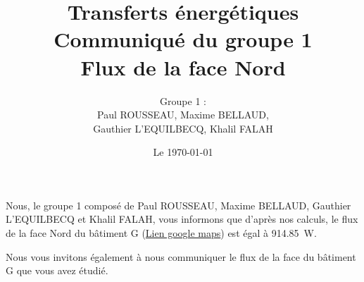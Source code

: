 \documentclass[12pt, a4paper]{article}
\title{Transferts énergétiques \\
Communiqué du groupe 1\\
Flux de la face Nord}
\author{Groupe 1 : \\
Paul ROUSSEAU, Maxime BELLAUD, \\Gauthier L'EQUILBECQ, Khalil FALAH}
\date{Le \today}
\begin{document}
\maketitle

Nous, le groupe 1 composé de Paul ROUSSEAU, Maxime BELLAUD, Gauthier L'EQUILBECQ et Khalil FALAH, vous informons que d'après nos calculs, le flux de la face Nord du bâtiment G (\href{https://maps.app.goo.gl/MGEAMG6irYY2ooVj6}{Lien google maps}) est égal à \SI{914.85}{\watt}.

Nous vous invitons également à nous communiquer le flux de la face du bâtiment G que vous avez étudié. 
\end{document}
